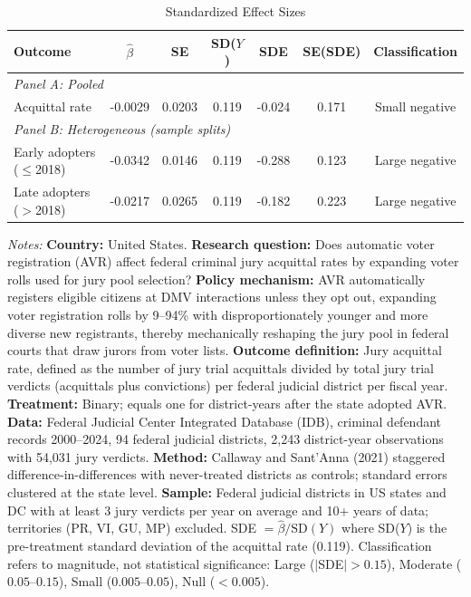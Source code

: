 \begin{table}[htbp]
\centering
\caption{Standardized Effect Sizes}
\label{tab:sde}
\begin{tabular}{lcccccc}
\hline\hline
Outcome & $\hat{\beta}$ & SE & SD($Y$) & SDE & SE(SDE) & Classification \\
\hline
\multicolumn{7}{l}{\textit{Panel A: Pooled}} \\
Acquittal rate & -0.0029 & 0.0203 & 0.119 & -0.024 & 0.171 & Small negative \\
\hline
\multicolumn{7}{l}{\textit{Panel B: Heterogeneous (sample splits)}} \\
Early adopters ($\leq$2018) & -0.0342 & 0.0146 & 0.119 & -0.288 & 0.123 & Large negative \\
Late adopters ($>$2018) & -0.0217 & 0.0265 & 0.119 & -0.182 & 0.223 & Large negative \\
\hline\hline
\end{tabular}
\begin{tablenotes}
\item \textit{Notes:} \textbf{Country:} United States. \textbf{Research question:} Does automatic voter registration (AVR) affect federal criminal jury acquittal rates by expanding voter rolls used for jury pool selection? \textbf{Policy mechanism:} AVR automatically registers eligible citizens at DMV interactions unless they opt out, expanding voter registration rolls by 9--94\% with disproportionately younger and more diverse new registrants, thereby mechanically reshaping the jury pool in federal courts that draw jurors from voter lists. \textbf{Outcome definition:} Jury acquittal rate, defined as the number of jury trial acquittals divided by total jury trial verdicts (acquittals plus convictions) per federal judicial district per fiscal year. \textbf{Treatment:} Binary; equals one for district-years after the state adopted AVR. \textbf{Data:} Federal Judicial Center Integrated Database (IDB), criminal defendant records 2000--2024, 94 federal judicial districts, 2,243 district-year observations with 54,031 jury verdicts. \textbf{Method:} Callaway and Sant'Anna (2021) staggered difference-in-differences with never-treated districts as controls; standard errors clustered at the state level. \textbf{Sample:} Federal judicial districts in US states and DC with at least 3 jury verdicts per year on average and 10+ years of data; territories (PR, VI, GU, MP) excluded. SDE $= \hat{\beta} / \text{SD}(Y)$ where SD($Y$) is the pre-treatment standard deviation of the acquittal rate (0.119). Classification refers to magnitude, not statistical significance: Large ($|$SDE$| > 0.15$), Moderate ($0.05$--$0.15$), Small ($0.005$--$0.05$), Null ($< 0.005$).
\end{tablenotes}
\end{table}

